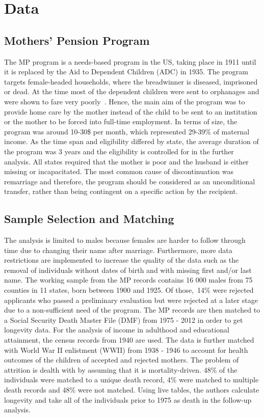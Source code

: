 \section{Data}\label{data}
\subsection{Mothers' Pension Program}
The MP program is a needs-based program in the US, taking place in 1911
until it is replaced by the Aid to Dependent Children (ADC) in 1935. The
program targets female-headed households, where the breadwinner is
diseased, imprisoned or dead. At the time most of the dependent children
were sent to orphanages and were shown to fare very
poorly~\citep{hopkins2011}. Hence, the main aim of the program was to
provide home care by the mother instead of the child to be sent to an
institution or the mother to be forced into full-time employment. In
terms of size, the program was around 10-30\$ per month, which
represented 29-39\% of maternal income. As the time span and eligibility
differed by state, the average duration of the program was 3 years and
the eligibility is controlled for in the further analysis. All states
required that the mother is poor and the husband is either missing or
incapacitated. The most common cause of discontinuation was remarriage
and therefore, the program should be considered as an unconditional
transfer, rather than being contingent on a specific action by the
recipient.
\subsection{Sample Selection and Matching}
The analysis is limited to males because females are harder to follow
through time due to changing their name after marriage. Furthermore,
more data restrictions are implemented to increase the quality of the
data such as the removal of individuals without dates of birth and with
missing first and/or last name. The working sample from the MP records
contains 16 000 males from 75 counties in 11 states, born
between 1900 and 1925. Of those,~14\% were rejected applicants who
passed a preliminary evaluation but were rejected at a later stage due
to a non-sufficient need of the program. The MP records are then matched
to a Social Security Death Master File (DMF) from 1975 - 2012 in order
to get longevity data. For the analysis of income in adulthood and
educational attainment, the census records from 1940 are used. The data
is further matched with World War II enlistment (WWII) from 1938 - 1946
to account for health outcomes of the children of accepted and rejected
mothers. The problem of attrition is dealth with by assuming that it
is mortality-driven. 48\% of the individuals were matched to a unique
death record, 4\% were matched to multiple death records and 48\% were
not matched. Using live tables, the authors calculate longevity and take
all of the individuals prior to 1975 as death in the follow-up
analysis.
